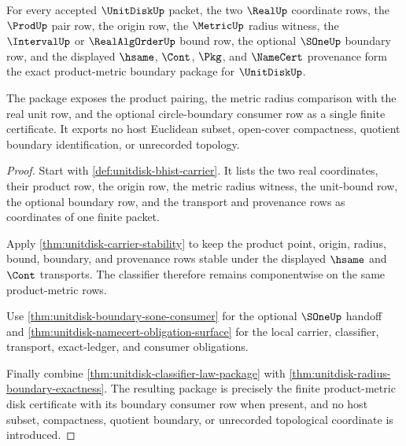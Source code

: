 \begin{theorem}
\label{thm:unitdisk-product-metric-boundary-package}
For every accepted $\UnitDiskUp$ packet, the two $\RealUp$ coordinate rows, the
$\ProdUp$ pair row, the origin row, the $\MetricUp$ radius witness, the
$\IntervalUp$ or $\RealAlgOrderUp$ bound row, the optional $\SOneUp$ boundary
row, and the displayed $\hsame$, $\Cont$, $\Pkg$, and $\NameCert$ provenance
form the exact product-metric boundary package for $\UnitDiskUp$.

The package exposes the product pairing, the metric radius comparison with the
real unit row, and the optional circle-boundary consumer row as a single finite
certificate. It exports no host Euclidean subset, open-cover compactness,
quotient boundary identification, or unrecorded topology.
\end{theorem}
\begin{proof}
Start with \autoref{def:unitdisk-bhist-carrier}. It lists the two real
coordinates, their product row, the origin row, the metric radius witness, the
unit-bound row, the optional boundary row, and the transport and provenance
rows as coordinates of one finite packet.

Apply \autoref{thm:unitdisk-carrier-stability} to keep the product point,
origin, radius, bound, boundary, and provenance rows stable under the displayed
$\hsame$ and $\Cont$ transports. The classifier therefore remains
componentwise on the same product-metric rows.

Use \autoref{thm:unitdisk-boundary-sone-consumer} for the optional $\SOneUp$
handoff and \autoref{thm:unitdisk-namecert-obligation-surface} for the local
carrier, classifier, transport, exact-ledger, and consumer obligations.

Finally combine \autoref{thm:unitdisk-classifier-law-package} with
\autoref{thm:unitdisk-radius-boundary-exactness}. The resulting package is
precisely the finite product-metric disk certificate with its boundary consumer
row when present, and no host subset, compactness, quotient boundary, or
unrecorded topological coordinate is introduced.
\end{proof}

